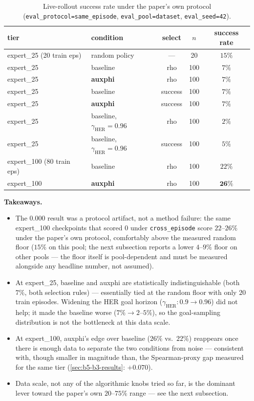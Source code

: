\documentclass[11pt]{article}
\begin{document}
\begin{table}[h]
\centering
\small
\caption{Live-rollout success rate under the paper's own protocol
(\texttt{eval\_protocol=same\_episode}, \texttt{eval\_pool=dataset}, \texttt{eval\_seed=42}).}
\begin{tabular}{llccc}
\toprule
tier & condition & select & $n$ & success rate \\
\midrule
expert\_25 (20 train eps) & random policy & --- & 20 & $15\%$ \\
expert\_25 & baseline & rho & 100 & $7\%$ \\
expert\_25 & \textbf{auxphi} & rho & 100 & $7\%$ \\
expert\_25 & baseline & success & 100 & $7\%$ \\
expert\_25 & \textbf{auxphi} & success & 100 & $7\%$ \\
expert\_25 & baseline, $\gamma_{\text{HER}}=0.96$ & rho & 100 & $2\%$ \\
expert\_25 & baseline, $\gamma_{\text{HER}}=0.96$ & success & 100 & $5\%$ \\
expert\_100 (80 train eps) & baseline & rho & 100 & $22\%$ \\
expert\_100 & \textbf{auxphi} & rho & 100 & $\mathbf{26\%}$ \\
\bottomrule
\end{tabular}
\end{table}

\textbf{Takeaways.}
\begin{itemize}[leftmargin=1.4em,itemsep=2pt]
\item The $0.000$ result was a protocol artifact, not a method failure: the same expert\_100
checkpoints that scored $0$ under \texttt{cross\_episode} score $22$--$26\%$ under the paper's
own protocol, comfortably above the measured random floor ($15\%$ on this pool; the next
subsection reports a lower $4$--$9\%$ floor on other pools --- the floor itself is
pool-dependent and must be measured alongside any headline number, not assumed).
\item At expert\_25, baseline and auxphi are statistically indistinguishable (both $7\%$, both
selection rules) --- essentially tied at the random floor with only $20$ train episodes.
Widening the HER goal horizon ($\gamma_{\text{HER}}: 0.9\to0.96$) did not help; it made the
baseline worse ($7\%\to2$--$5\%$), so the goal-sampling distribution is not the bottleneck at
this data scale.
\item At expert\_100, auxphi's edge over baseline ($26\%$ vs.\ $22\%$) reappears once there is
enough data to separate the two conditions from noise --- consistent with, though smaller in
magnitude than, the Spearman-proxy gap measured for the same tier
(\cref{sec:b5-b3-results}: $+0.070$).
\item Data scale, not any of the algorithmic knobs tried so far, is the dominant lever toward
the paper's own $20$--$75\%$ range --- see the next subsection.
\end{itemize}
\end{document}
